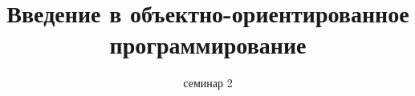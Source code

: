 \documentclass[hyperref={unicode}]{beamer}
\title{Введение в объектно-ориентированное программирование}
\subtitle{семинар 2}
\begin{document}
\frame{\titlepage}


\end{document}
